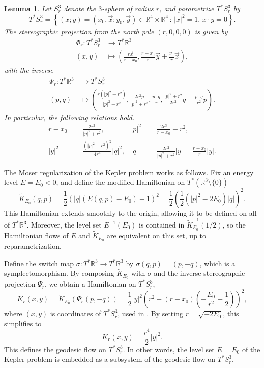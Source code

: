 \documentclass{amsart}
\newcommand{\R}{\mathbb{R}}
\newtheorem{lmm}[thm]{Lemma}
\begin{document}
\begin{lmm}\label{Lemma - Stereographic Projection}
Let $S^3_r$ denote the $3$-sphere of radius $r$, and parametrize $T^*S_r^3$ by
	$$
	T^*S_r^3 = \left\{(x;y) = (x_0,\vec{x};y_0,\vec{y})\in \R^4\times \R^4\,:\,|x|^2=1,\,x\cdot y=0\right\}.
	$$
The stereographic projection from the north pole $(r,0,0,0)$ is given by
	$$
	\begin{aligned}
		\Phi_r:T^*S_r^3&\to T^*\R^3\\
		(x,y)&\mapsto\left(\frac{r\vec{x}}{r-x_0},\frac{r-x_0}{r}\vec{y}+\frac{y_0}{r}\vec{x}\right),
	\end{aligned}
	$$
with the inverse
	$$
	\begin{aligned}
		\Psi_r:T^*\R^3&\to T^*S_r^3\\
		(p,q)&\mapsto
		\left(\frac{r(|p|^2-r^2)}{|p|^2+r^2},\frac{2r^2p}{|p|^2+r^2},\frac{p\cdot q}{r},\frac{|p|^2+r^2}{2r^2}q - \frac{p\cdot q}{r^2}p\right).
	\end{aligned}
	$$
In particular, the following relations hold.
	$$
	\begin{aligned}
		r-x_0&=\frac{2r^3}{|p|^2+r^2}, &|p|^2&=\frac{2r^3}{r-x_0}-r^2,\\
		|y|^2 & = \frac{(|p|^2+r^2)^2}{4r^4}|q|^2,&|q|&=\frac{2r^2}{|p|^2+r^2}|y|=\frac{r-x_0}{r}|y|.
	\end{aligned}
	$$	
\end{lmm}

The Moser regularization of the Kepler problem works as follows.
Fix an energy level $E = E_0 < 0$, and define the modified Hamiltonian on $T^*(\R^3 \setminus \{0\})$
$$
\tilde{K}_{E_0}(q,p) = \frac{1}{2}\left(|q|\left(E(q,p)-E_0\right)+1\right)^2
= \frac{1}{2}\left(\frac{1}{2}(|p|^2-2E_0)|q|\right)^2.
$$
This Hamiltonian extends smoothly to the origin, allowing it to be defined on all of $T^*\R^3$.
Moreover, the level set $E^{-1}(E_0)$ is contained in $\tilde{K}_{E_0}^{-1}(1/2)$, so the Hamiltonian flows of $E$ and $\tilde{K}_{E_0}$ are equivalent on this set, up to reparametrization.

Define the switch map $\sigma: T^*\R^3 \to T^*\R^3$ by $\sigma(q,p) = (p, -q)$, which is a symplectomorphism.
By composing $\tilde{K}_{E_0}$ with $\sigma$ and the inverse stereographic projection $\Psi_r$, we obtain a Hamiltonian on $T^*S^3_r$,
$$
K_r(x,y) = \tilde{K}_{E_0}(\Psi_r(p,-q))=\frac{1}{2}|y|^2 \left(r^2 + (r-x_0)\left(-\frac{E_0}{r^2}-\frac{1}{2}\right)\right)^2,
$$
where $(x,y)$ is coordinates of $T^*S^3_r$, used in .
By setting $r = \sqrt{-2E_0}$, this simplifies to
$$
K_r(x,y) = \frac{r^4}{2}|y|^2.
$$
This defines the geodesic flow on $T^*S^3_r$.
In other words, the level set $E = E_0$ of the Kepler problem is embedded as a subsystem of the geodesic flow on $T^*S^3_r$.
\end{document}
